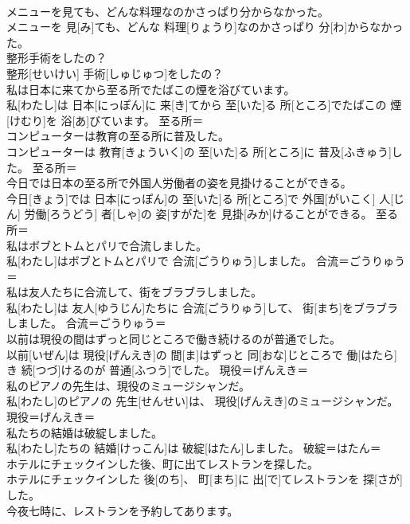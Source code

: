\documentclass[8pt]{extreport}
\begin{document}
\begin{CJK}{UTF8}{min}
\\	メニューを見ても、どんな料理なのかさっぱり分からなかった。	
\\	メニューを 見[み]ても、どんな 料理[りょうり]なのかさっぱり 分[わ]からなかった。	
\\	整形手術をしたの？	
\\	整形[せいけい] 手術[しゅじゅつ]をしたの？	
\\	私は日本に来てから至る所でたばこの煙を浴びています。	
\\	私[わたし]は 日本[にっぽん]に 来[き]てから 至[いた]る 所[ところ]でたばこの 煙[けむり]を 浴[あ]びています。	至る所＝ 
\\	コンピューターは教育の至る所に普及した。	
\\	コンピューターは 教育[きょういく]の 至[いた]る 所[ところ]に 普及[ふきゅう]した。	至る所＝ 
\\	今日では日本の至る所で外国人労働者の姿を見掛けることができる。	
\\	今日[きょう]では 日本[にっぽん]の 至[いた]る 所[ところ]で 外国[がいこく] 人[じん] 労働[ろうどう] 者[しゃ]の 姿[すがた]を 見掛[みか]けることができる。	至る所＝ 
\\	私はボブとトムとパリで合流しました。	
\\	私[わたし]はボブとトムとパリで 合流[ごうりゅう]しました。	合流＝ごうりゅう＝ 
\\	私は友人たちに合流して、街をブラブラしました。	
\\	私[わたし]は 友人[ゆうじん]たちに 合流[ごうりゅう]して、 街[まち]をブラブラしました。	合流＝ごうりゅう＝ 
\\	以前は現役の間はずっと同じところで働き続けるのが普通でした。	
\\	以前[いぜん]は 現役[げんえき]の 間[ま]はずっと 同[おな]じところで 働[はたら]き 続[つづ]けるのが 普通[ふつう]でした。	現役＝げんえき＝ 
\\	私のピアノの先生は、現役のミュージシャンだ。	
\\	私[わたし]のピアノの 先生[せんせい]は、 現役[げんえき]のミュージシャンだ。	現役＝げんえき＝ 
\\	私たちの結婚は破綻しました。	
\\	私[わたし]たちの 結婚[けっこん]は 破綻[はたん]しました。	破綻＝はたん＝ 
\\	ホテルにチェックインした後、町に出てレストランを探した。	
\\	ホテルにチェックインした 後[のち]、 町[まち]に 出[で]てレストランを 探[さが]した。	
\\	今夜七時に、レストランを予約してあります。	

\end{CJK}
\end{document}

